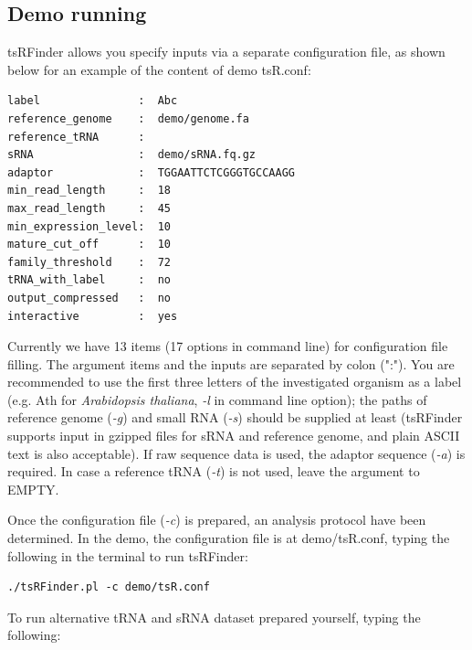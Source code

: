 \documentclass[11pt, a4paper]{article}
\begin{document}
\subsection{Demo running}

tsRFinder allows you specify inputs via a separate configuration file, as shown below for an example of the content of demo tsR.conf:

{\footnotesize \begin{tcolorbox}[colback=blue!5!white,colframe=pink!75!black,title=Demo configuration file for tsRFinder: demo/tsR.conf]
\begin{verbatim}
label               :  Abc
reference_genome    :  demo/genome.fa
reference_tRNA      :
sRNA                :  demo/sRNA.fq.gz
adaptor             :  TGGAATTCTCGGGTGCCAAGG
min_read_length     :  18
max_read_length     :  45
min_expression_level:  10
mature_cut_off      :  10
family_threshold    :  72
tRNA_with_label     :  no
output_compressed   :  no
interactive         :  yes
\end{verbatim}
\end{tcolorbox}}

Currently we have 13 items (17 options in command line) for configuration file filling. The argument items and the inputs are separated by colon (":"). You are recommended to use the first three letters of the investigated organism as a label (e.g. Ath for \textit{Arabidopsis thaliana}, \emph{-l} in command line option); the paths of reference genome (\emph{-g}) and small RNA (\emph{-s}) should be supplied at least (tsRFinder supports input in gzipped files for sRNA and reference genome, and plain ASCII text is also acceptable). If raw sequence data is used, the adaptor sequence (\emph{-a}) is required. In case a reference tRNA (\emph{-t}) is not used, leave the argument to EMPTY.

Once the configuration file (\emph{-c}) is prepared, an analysis protocol have been determined. In the demo, the configuration file is at demo/tsR.conf, typing the following in the terminal to run tsRFinder:

{\footnotesize \begin{tcolorbox}[colback=blue!5!white,colframe=pink!75!black,title=Running tsRFinder demo]
\begin{verbatim}
./tsRFinder.pl -c demo/tsR.conf
\end{verbatim}
\end{tcolorbox}}

To run alternative tRNA and sRNA dataset prepared yourself, typing the following:
\end{document}
